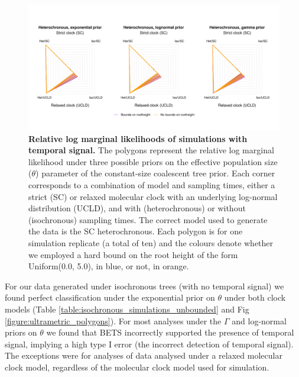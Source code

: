 \documentclass[10pt,letterpaper]{article}
\begin{document}
\begin{figure}[!h]
	\begin{center}
		\includegraphics[width=14cm]{sandbox_figures/het_sims.pdf}\newline
		\vspace{-0.5cm}
		\caption{\textbf{Relative log marginal likelihoods of simulations with temporal signal.} The polygons represent the relative log marginal likelihood under three possible priors on the effective population size ($\theta$) parameter of the constant-size coalescent tree prior. Each corner corresponds to a combination of model and sampling times, either a strict (SC) or relaxed molecular clock with an underlying log-normal distribution (UCLD), and with (heterochronous) or without (isochronous) sampling times. The correct model used to generate the data is the SC heterochronous. Each polygon is for one simulation replicate (a total of ten) and the colours denote whether we employed a hard bound on the root height of the form Uniform(0.0, 5.0), in blue, or not, in orange.} 
		\label{figure:heterochronous_polygons}
	\end{center}
\end{figure}

For our data generated under isochronous trees (with no temporal signal) we found perfect classification under the exponential prior on $\theta$ under both clock models (Table \ref{table:isochronous_simulations_unbounded} and Fig \ref{figure:ultrametric_polygons}). For most analyses under the $\Gamma$ and log-normal priors on $\theta$ we found that BETS incorrectly supported the presence of temporal signal, implying a high type I error (the incorrect detection of temporal signal). The exceptions were for analyses of data analysed under a relaxed molecular clock model, regardless of the molecular clock model used for simulation. 
\end{document}
